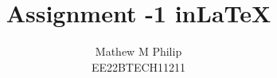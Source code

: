 \documentclass[journal,12pt,twocolumn]{IEEEtran}
\begin{document}
\let\vec\mathbf




\vspace{3cm}

\title{
Assignment -1  in\LaTeX
}
\author{ Mathew M Philip \\
	EE22BTECH11211
	
}	


%
%
%

% 
%
\end{document}
